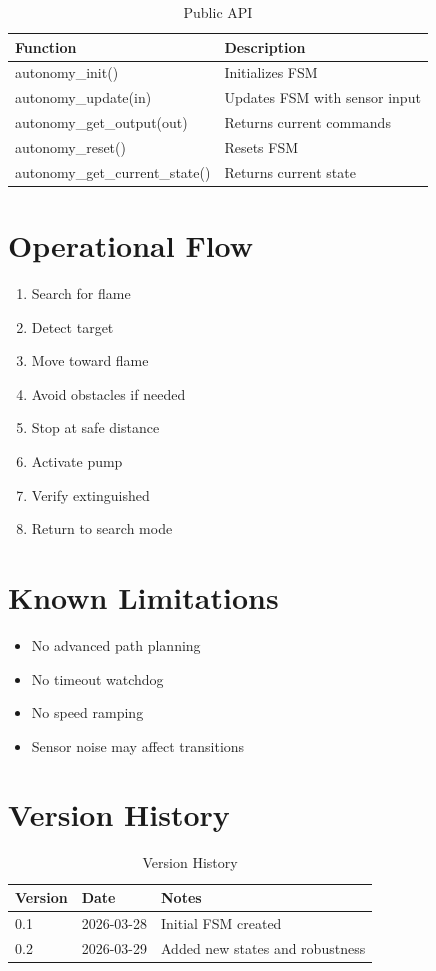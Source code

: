 \documentclass[12pt,a4paper]{article}
\begin{document}
\begin{table}[H]
\centering
\begin{tabularx}{\linewidth}{lX}
\toprule
Function & Description \\
\midrule
autonomy\_init() & Initializes FSM \\
autonomy\_update(in) & Updates FSM with sensor input \\
autonomy\_get\_output(out) & Returns current commands \\
autonomy\_reset() & Resets FSM \\
autonomy\_get\_current\_state() & Returns current state \\
\bottomrule
\end{tabularx}
\caption{Public API}
\end{table}

\FloatBarrier
\section{Operational Flow}

\begin{enumerate}
\item Search for flame
\item Detect target
\item Move toward flame
\item Avoid obstacles if needed
\item Stop at safe distance
\item Activate pump
\item Verify extinguished
\item Return to search mode
\end{enumerate}

\FloatBarrier
\section{Known Limitations}

\begin{itemize}
\item No advanced path planning
\item No timeout watchdog
\item No speed ramping
\item Sensor noise may affect transitions
\end{itemize}

\FloatBarrier
\section{Version History}

\begin{table}[H]
\centering
\begin{tabularx}{\linewidth}{llX}
\toprule
Version & Date & Notes \\
\midrule
0.1 & 2026-03-28 & Initial FSM created \\
0.2 & 2026-03-29 & Added new states and robustness \\
\bottomrule
\end{tabularx}
\caption{Version History}
\end{table}
\end{document}
